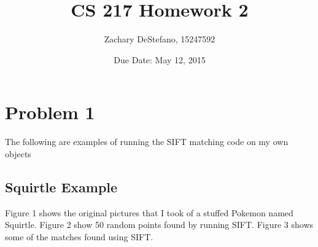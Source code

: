\documentclass[11pt,psfig]{article}
\begin{document}
\setlength{\parskip}{1.2ex plus0.3ex minus 0.3ex}


\thispagestyle{empty} \pagestyle{myheadings} 



\title{CS 217 Homework 2}
\author{Zachary DeStefano, 15247592}
\date{Due Date: May 12, 2015}

\maketitle

\vfill\eject

\newpage

\section*{Problem 1}

The following are examples of running the SIFT matching code on my own objects

\subsection*{Squirtle Example}

Figure 1 shows the original pictures that I took of a stuffed Pokemon named Squirtle. Figure 2 show 50 random points found by running SIFT. Figure 3 shows some of the matches found using SIFT. 
\end{document}
